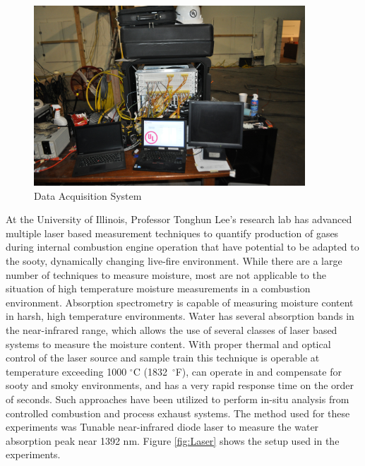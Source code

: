 \documentclass[12pt,oneside]{book}
\begin{document}
\begin{figure}[H]
	\centering
	\includegraphics[width = 4in]{../0_Images/Instrumentation/DataSystem.jpg}
	\caption{Data Acquisition System}
	\label{fig:DataSystem}
\end{figure}

At the University of Illinois, Professor Tonghun Lee's research lab has advanced multiple laser based measurement techniques to quantify production of gases during internal combustion engine operation that have potential to be adapted to the sooty, dynamically changing live-fire environment. While there are a large number of techniques to measure moisture, most are not applicable to the situation of high temperature moisture measurements in a combustion environment.  Absorption spectrometry is capable of measuring moisture content in harsh, high temperature environments.  Water has several absorption bands in the near-infrared range, which allows the use of several classes of laser based systems to measure the moisture content.  With proper thermal and optical control of the laser source and sample train this technique is operable at temperature exceeding 1000 $^\circ$C (1832~$^\circ$F), can operate in and compensate for sooty and smoky environments, and has a very rapid response time on the order of seconds.  Such approaches have been utilized to perform in-situ analysis from controlled combustion and process exhaust systems.  The method used for these experiments was Tunable near-infrared diode laser to measure the water absorption peak near 1392 nm. Figure \ref{fig:Laser} shows the setup used in the experiments.
\end{document}
